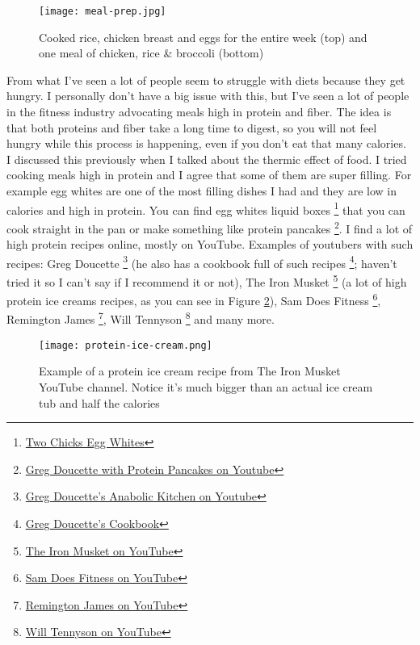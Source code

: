 \documentclass[openany, 12pt]{book}
\begin{document}
	\begin{figure}[h]
		\centering
		\texttt{[image: meal-prep.jpg]}
		\caption{Cooked rice, chicken breast and eggs for the entire week (top) and one meal of chicken, rice \& broccoli (bottom)}
		\label{fig4}
	\end{figure}

        From what I've seen a lot of people seem to struggle with diets because they get hungry. I personally don't have a big issue with this, but I've seen a lot of people in 
        the fitness industry advocating meals high in protein and fiber. The idea is that both proteins and fiber take a long time to digest, so you will not feel hungry while
        this process is happening, even if you don't eat that many calories. I discussed this previously when I talked about the thermic effect of food.
        I tried cooking meals high in protein and I agree that some of them are super filling. For example egg whites are
        one of the most filling dishes I had and they are low in calories and high in protein. You can find egg whites liquid boxes
        \footnote{\href{https://twochicks.co.uk}{Two Chicks Egg Whites}} that you can cook straight in
        the pan or make something like protein pancakes
        \footnote{\href{https://www.youtube.com/watch?v=aDJ8K_gqzdI}{Greg Doucette with Protein Pancakes on Youtube}}. 
        I find a lot of high protein recipes online, mostly on YouTube. Examples of youtubers with such recipes: Greg Doucette
        \footnote{\href{https://www.youtube.com/playlist?list=PLNAZHiu0ASAprWRUxQHAiHG1FhlJbyeIm}{Greg Doucette's Anabolic Kitchen on Youtube}}        
        (he also has a cookbook full of such recipes
        \footnote{\href{https://www.gregdoucette.com/products/cookbook-2}{Greg Doucette's Cookbook}}; haven't
        tried it so I can't say if I recommend it or not), The Iron Musket
        \footnote{\href{https://www.youtube.com/channel/UC3Pec4Q-1CEc9WXjVk2z6Bg}{The Iron Musket on YouTube}}
        (a lot of high protein ice creams recipes, as you can see in Figure \ref{fig5}), Sam Does Fitness
        \footnote{\href{https://www.youtube.com/channel/UC8JUC4wItW2EwpeMkCSyRUw/}{Sam Does Fitness on YouTube}}, Remington James
        \footnote{\href{https://www.youtube.com/channel/UCO9Rhj_x_GgJl-Ria7257EA}{Remington James on YouTube}}, Will Tennyson
        \footnote{\href{https://www.youtube.com/channel/UCB2wtYpfbCpYDc5TeTwuqFA}{Will Tennyson on YouTube}} and many more.

	\begin{figure}[h]
		\centering
		\texttt{[image: protein-ice-cream.png]}
		\caption{Example of a protein ice cream recipe from The Iron Musket YouTube channel. Notice it's much bigger than an actual ice cream tub and half the calories}
		\label{fig5}
	\end{figure}
\end{document}
